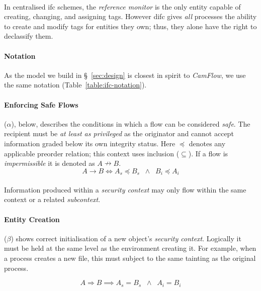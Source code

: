 \paragraph{} In centralised \acrshort{ifc} schemes, the \textit{reference monitor} is the only entity capable of creating, changing, and assigning tags. However \acrshort{difc} gives \textit{all} processes the ability to create and modify tags for entities they own; thus, they alone have the right to declassify them.

\paragraph{Notation} As the model we build in §~\ref{sec:design} is closest in spirit to \textit{CamFlow}, we use the same notation (Table~\ref{table:ifc-notation}).

\paragraph{Enforcing Safe Flows} ($\alpha$), below, describes the conditions in which a flow can be considered \textit{safe}. The recipient must be \textit{at least as privileged} as the originator and cannot accept information graded below its own integrity status. Here $\preceq$ denotes any applicable preorder relation; this context uses inclusion ($\subseteq$). If a flow is \textit{impermissible} it is denoted as $A \nrightarrow B$.
\begin{equation}
    A \rightarrow B \iff A_s \preceq B_s \;\; \land \;\; B_i \preceq A_i \tag{$\alpha$}
\end{equation}
\paragraph{} Information produced within a \textit{security context} may only flow within the same context or a related \textit{subcontext}.

\paragraph{Entity Creation} ($\beta$) shows correct initialisation of a new object's \textit{security context}. Logically it must be held at the same level as the environment creating it. For example, when a process creates a new file, this must subject to the same tainting as the original process.

\begin{equation}
    A \Rightarrow B \implies A_s = B_s \;\; \land \;\; A_i = B_i \tag{$\beta$}
\end{equation}

